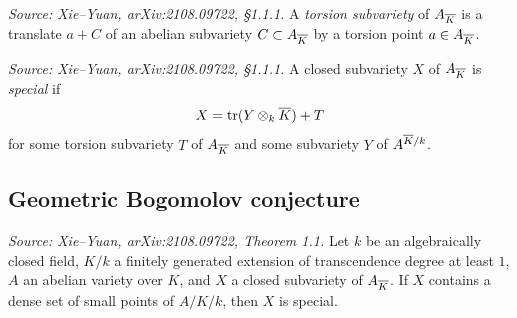 \begin{definition}
  \label{def:TorsionSubvariety}
  \uses{}
  \textit{Source: Xie--Yuan, arXiv:2108.09722, \S1.1.1.}
  A \emph{torsion subvariety} of \(A_{\overline{K}}\) is a translate \(a+C\) of an abelian subvariety
  \(C \subset A_{\overline{K}}\) by a torsion point \(a \in A_{\overline{K}}\).
\end{definition}

\begin{definition}
  \label{def:SpecialSubvariety}
  \textit{Source: Xie--Yuan, arXiv:2108.09722, \S1.1.1.}
  A closed subvariety \(X\) of \(A_{\overline{K}}\) is \emph{special} if
  \[
    X = \operatorname{tr}(Y \otimes_k \overline{K}) + T
  \]
  for some torsion subvariety \(T\) of \(A_{\overline{K}}\) and some subvariety \(Y\) of
  \(A^{\overline{K}/k}\).
\end{definition}

\subsection{Geometric Bogomolov conjecture}

\begin{theorem}
  \label{thm:main}
  \textit{Source: Xie--Yuan, arXiv:2108.09722, Theorem 1.1.}
  Let \(k\) be an algebraically closed field, \(K/k\) a finitely generated extension of
  transcendence degree at least \(1\), \(A\) an abelian variety over \(K\), and \(X\) a
  closed subvariety of \(A_{\overline{K}}\).  If \(X\) contains a dense set of small points of
  \(A/K/k\), then \(X\) is special.
\end{theorem}

